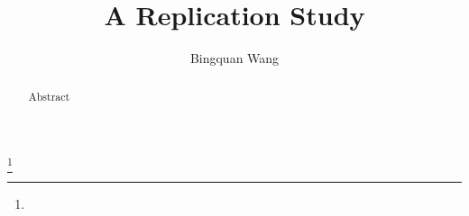 \documentclass[acmlarge]{acmart}
\begin{document}
\title{A Replication Study} 

\author{Bingquan Wang}

\begin{abstract}
Abstract
\end{abstract}

%
%


\keywords{}


\thanks{}


\maketitle












\end{document}
